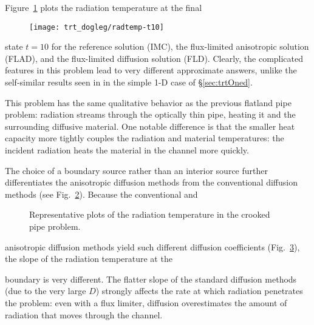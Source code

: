 Figure~\ref{fig:doglegRadtempFinal} plots the radiation temperature at the final
%
\begin{figure}[htb]
  \centering
  \hspace{-.5in}%
  \texttt{[image: trt\_dogleg/radtemp-t10]}
  \label{fig:doglegRadtempFinal}
\end{figure}
%
state $t=10$ for the reference solution (IMC), the flux-limited anisotropic
solution (FLAD), and the flux-limited diffusion solution (FLD). Clearly, the
complicated features in this problem lead to very different approximate
answers, unlike the self-similar results seen in in the simple 1-D case of
\S\ref{sec:trtOned}.

This problem has the same qualitative behavior as the previous flatland pipe
problem: radiation streams through the optically thin pipe, heating it and
the surrounding diffusive material. One notable difference is that the smaller
heat capacity more tightly
couples the radiation and material temperatures: the incident radiation heats
the material in the channel more quickly.

The choice of a boundary source rather than an interior source further
differentiates the anisotropic diffusion methods from the conventional diffusion
methods (see Fig.~\ref{fig:doglegRadtemp}). Because the conventional and
%
\begin{figure}[htb]
  \centering\small
  \subfloat[Leg 1 at $t=0.5$]{%
    \hspace{-.25in}%
    
    \label{fig:doglegRadtemp1}
  }%
  \subfloat[Leg 2 at $t=3.0$]{%
    \hspace{-.25in}%
    
    \label{fig:doglegRadtemp2}
  }%
  \caption{Representative plots of the radiation temperature in the crooked
  pipe problem.}
  \label{fig:doglegRadtemp}
\end{figure}
%
anisotropic diffusion methods yield such different diffusion coefficients
(Fig.~\ref{fig:doglegDcoeff}), the slope of the radiation temperature at the
%
\begin{figure}[htb]
  \centering\small
  \subfloat[Leg 1]{%
    \hspace{-.25in}%
    
  }%
  \subfloat[Leg 2]{%
    \hspace{-.25in}%
    
  }%
  \label{fig:doglegDcoeff}
\end{figure}
%
boundary is very different. The flatter slope of the standard
diffusion methods (due to the very large $D$) strongly affects the rate at which
radiation penetrates the problem: even with a flux limiter, diffusion
overestimates the amount of radiation that moves through the channel.

